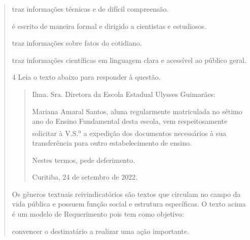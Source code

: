 \begin{quote}
\begin{escolha}
  
  \item traz informações técnicas e de difícil compreensão.
  
  \item é escrito de maneira formal e dirigido a cientistas e estudiosos.
  
  \item traz informações sobre fatos do cotidiano.
  
  \item traz informações científicas em linguagem clara e acessível ao público
  geral.

\end{escolha}


\num{4} Leia o texto abaixo para responder à questão.

\begin{quote}

Ilma. Sra. Diretora da Escola Estadual Ulysses Guimarães:

Mariana Amaral Santos, aluna regularmente matriculada no sétimo ano do
Ensino Fundamental desta escola, vem respeitosamente solicitar à V.S.\textsuperscript{a} a
expedição dos documentos necessários à sua transferência para outro
estabelecimento de ensino.

Nestes termos, pede deferimento.

Curitiba, 24 de setembro de 2022.

\end{quote}


Os gêneros textuais reivindicatórios são textos que circulam no campo da
vida pública e possuem função social e estrutura específicas. O texto
acima é um modelo de Requerimento pois tem como objetivo:

\begin{escolha} 

\item convencer o destinatário a realizar uma ação importante.


\end{escolha}
\end{quote}
